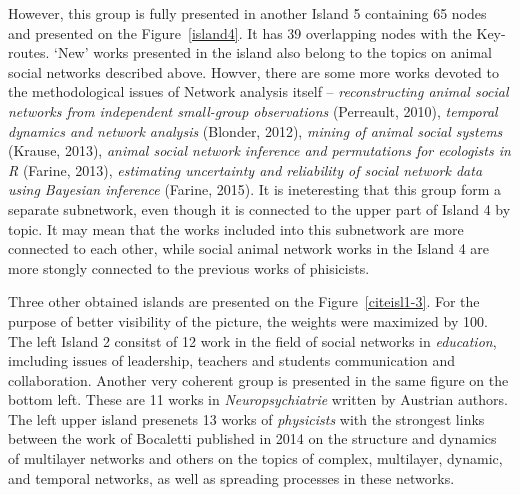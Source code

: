 \documentclass[11pt]{article} %
\begin{document}
However, this group is fully presented in another Island 5 containing 65 nodes and presented on the Figure~\ref{island4}. It has 39 overlapping nodes with the Key-routes. `New' works presented in the island also belong to the topics on animal social networks described above. Howver, there are some more works devoted to the methodological issues of Network analysis itself --  \textit{reconstructing animal social networks from independent small-group observations} (Perreault, 2010), \textit{temporal dynamics and network analysis} (Blonder, 2012), \textit{mining of animal social systems} (Krause, 2013), \textit{animal social network inference and permutations for ecologists in R} (Farine, 2013), \textit{estimating uncertainty and reliability of social network data using Bayesian inference} (Farine, 2015). It is ineteresting that this group form a separate subnetwork, even though it is connected to the upper part of Island 4 by topic. It may mean that the works included into this subnetwork are more connected to each other, while social animal network works in the Island 4 are more stongly connected to the previous works of phisicists.  \medskip   

Three other obtained islands are presented on the Figure~\ref{citeisl1-3}. For the purpose of better visibility of the picture, the weights were maximized by 100. The left Island 2 consitst of 12 work in the field of social networks in \textit{education}, imcluding issues of leadership, teachers and students communication and collaboration. Another very coherent group is presented in the same figure on the bottom left. These are 11 works in \textit{Neuropsychiatrie} written by Austrian authors. The left upper island presenets 13 works of \textit{physicists} with the strongest links between the work of Bocaletti published in 2014 on the structure and dynamics of multilayer networks and others on the topics of complex, multilayer, dynamic, and temporal networks, as well as spreading processes in these networks.  \medskip    
\end{document}
